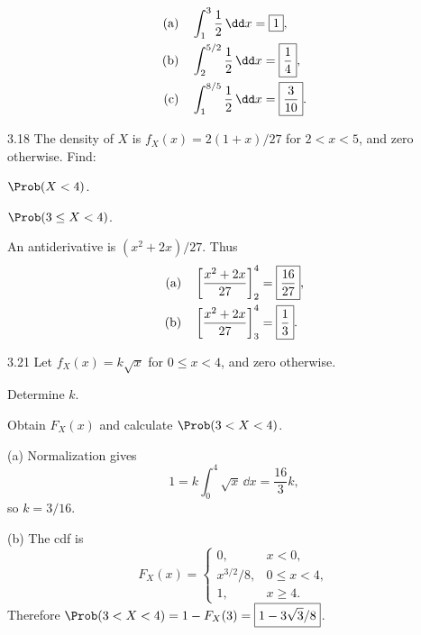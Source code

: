 \documentclass[11pt,oneside]{article}
\begin{document}
\begin{solution}
\begin{align*}
\textup{(a)}\quad&\int_1^3\frac12\,\dd x=\boxed{1},\\
\textup{(b)}\quad&\int_2^{5/2}\frac12\,\dd x=\boxed{\frac14},\\
\textup{(c)}\quad&\int_1^{8/5}\frac12\,\dd x=\boxed{\frac3{10}}.
\end{align*}
\end{solution}

\begin{exercise}{3.18}
The density of $X$ is $f_X(x)=2(1+x)/27$ for $2<x<5$, and zero otherwise. Find:
\begin{exercisesubparts}
\item $\Prob(X<4)$.
\item $\Prob(3\le X<4)$.
\end{exercisesubparts}
\end{exercise}

\begin{solution}
An antiderivative is $(x^2+2x)/27$. Thus
\begin{align*}
\textup{(a)}\quad&\left[\frac{x^2+2x}{27}\right]_2^4=\boxed{\frac{16}{27}},\\
\textup{(b)}\quad&\left[\frac{x^2+2x}{27}\right]_3^4=\boxed{\frac13}.
\end{align*}
\end{solution}

\begin{exercise}{3.21}
Let $f_X(x)=k\sqrt{x}$ for $0\le x<4$, and zero otherwise.
\begin{exercisesubparts}
\item Determine $k$.
\item Obtain $F_X(x)$ and calculate $\Prob(3<X<4)$.
\end{exercisesubparts}
\end{exercise}

\begin{solution}
\noindent\textup{(a)} Normalization gives
\[
1=k\int_0^4\sqrt{x}\,\dd x=\frac{16}{3}k,
\]
so $\boxed{k=3/16}$.\par\medskip
\noindent\textup{(b)} The cdf is
\[
F_X(x)=\begin{cases}
0,&x<0,\\x^{3/2}/8,&0\le x<4,\\1,&x\ge4.
\end{cases}
\]
Therefore $\Prob(3<X<4)=1-F_X(3)=\boxed{1-3\sqrt3/8}$.
\end{solution}
\end{document}
